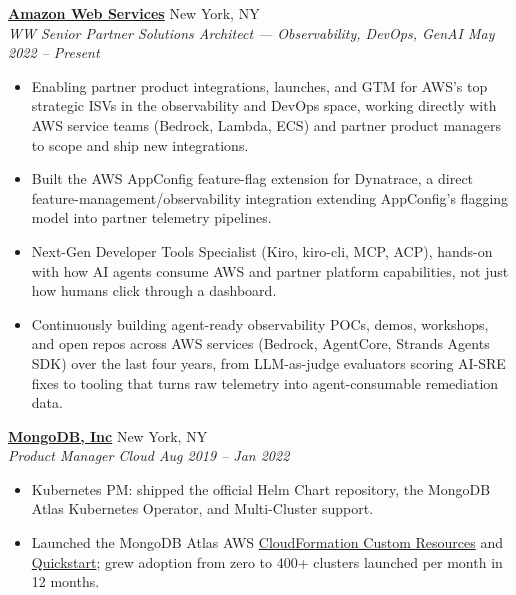 \documentclass[10pt,letterpaper]{article}
\begin{document}
\textbf{\href{https://aws.amazon.com/}{Amazon Web Services}} \hfill {\small\color{lighttext} New York, NY}\\
{\small\itshape\color{accent} WW Senior Partner Solutions Architect --- Observability, DevOps, GenAI \hfill May 2022 -- Present}
\begin{itemize}
\item {\small Enabling partner product integrations, launches, and GTM for AWS's top strategic ISVs in the observability and DevOps space, working directly with AWS service teams (Bedrock, Lambda, ECS) and partner product managers to scope and ship new integrations.}
\item {\small Built the AWS AppConfig feature-flag extension for Dynatrace, a direct feature-management/observability integration extending AppConfig's flagging model into partner telemetry pipelines.}
\item {\small Next-Gen Developer Tools Specialist (Kiro, kiro-cli, MCP, ACP), hands-on with how AI agents consume AWS and partner platform capabilities, not just how humans click through a dashboard.}
\item {\small Continuously building agent-ready observability POCs, demos, workshops, and open repos across AWS services (Bedrock, AgentCore, Strands Agents SDK) over the last four years, from LLM-as-judge evaluators scoring AI-SRE fixes to tooling that turns raw telemetry into agent-consumable remediation data.}
\end{itemize}

\textbf{\href{https://www.mongodb.com/}{MongoDB, Inc}} \hfill {\small\color{lighttext} New York, NY}\\
{\small\itshape\color{accent} Product Manager Cloud \hfill Aug 2019 -- Jan 2022}
\begin{itemize}
\item {\small Kubernetes PM: shipped the official Helm Chart repository, the MongoDB Atlas Kubernetes Operator, and Multi-Cluster support.}
\item {\small Launched the MongoDB Atlas AWS \href{https://github.com/mongodb/mongodbatlas-cloudformation-resources}{CloudFormation Custom Resources} and \href{https://aws.amazon.com/quickstart/architecture/mongodb-atlas/}{Quickstart}; grew adoption from zero to 400+ clusters launched per month in 12 months.}
\end{itemize}
\end{document}
